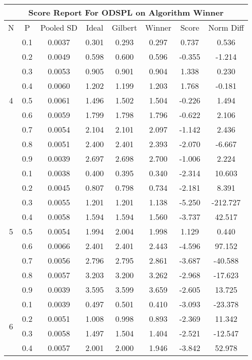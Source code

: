 \documentclass[11pt,a4paper]{report}
\begin{document}
\begin{longtable}{ | c | c || c | c | c | c | c | c | }
\hline
\multicolumn{8}{|c|}{ Score Report For ODSPL on Algorithm Winner} \\
\hline
N & P & Pooled SD &  Ideal &  Gilbert & Winner  & Score & Norm Diff \\
 \hline
 \hline
 \endhead
\multirow{9}{*}{4} & 0.1 & 0.0037 & 0.301 & 0.293 & 0.297 & 0.737 & 0.536 \\
 & 0.2 & 0.0049 & 0.598 & 0.600 & 0.596 & -0.355 & -1.214 \\
 & 0.3 & 0.0053 & 0.905 & 0.901 & 0.904 & 1.338 & 0.230 \\
 & 0.4 & 0.0060 & 1.202 & 1.199 & 1.203 & 1.768 & -0.181 \\
 & 0.5 & 0.0061 & 1.496 & 1.502 & 1.504 & -0.226 & 1.494 \\
 & 0.6 & 0.0059 & 1.799 & 1.798 & 1.796 & -0.622 & 2.106 \\
 & 0.7 & 0.0054 & 2.104 & 2.101 & 2.097 & -1.142 & 2.436 \\
 & 0.8 & 0.0051 & 2.400 & 2.401 & 2.393 & -2.070 & -6.667 \\
 & 0.9 & 0.0039 & 2.697 & 2.698 & 2.700 & -1.006 & 2.224 \\
 \hline
\multirow{9}{*}{5} & 0.1 & 0.0038 & 0.400 & 0.395 & 0.340 & -2.314 & 10.603 \\
 & 0.2 & 0.0045 & 0.807 & 0.798 & 0.734 & -2.181 & 8.391 \\
 & 0.3 & 0.0055 & 1.201 & 1.201 & 1.138 & -5.250 & -212.727 \\
 & 0.4 & 0.0058 & 1.594 & 1.594 & 1.560 & -3.737 & 42.517 \\
 & 0.5 & 0.0054 & 1.994 & 2.004 & 1.998 & 1.129 & 0.440 \\
 & 0.6 & 0.0066 & 2.401 & 2.401 & 2.443 & -4.596 & 97.152 \\
 & 0.7 & 0.0056 & 2.796 & 2.795 & 2.861 & -3.687 & -40.588 \\
 & 0.8 & 0.0057 & 3.203 & 3.200 & 3.262 & -2.968 & -17.623 \\
 & 0.9 & 0.0039 & 3.595 & 3.599 & 3.659 & -2.605 & 13.725 \\
 \hline
\multirow{9}{*}{6} & 0.1 & 0.0039 & 0.497 & 0.501 & 0.410 & -3.093 & -23.378 \\
 & 0.2 & 0.0051 & 1.008 & 0.998 & 0.893 & -2.369 & 11.342 \\
 & 0.3 & 0.0058 & 1.497 & 1.504 & 1.404 & -2.521 & -12.547 \\
 & 0.4 & 0.0057 & 2.001 & 2.000 & 1.946 & -3.842 & 52.978 \\

\end{longtable}
\end{document}
